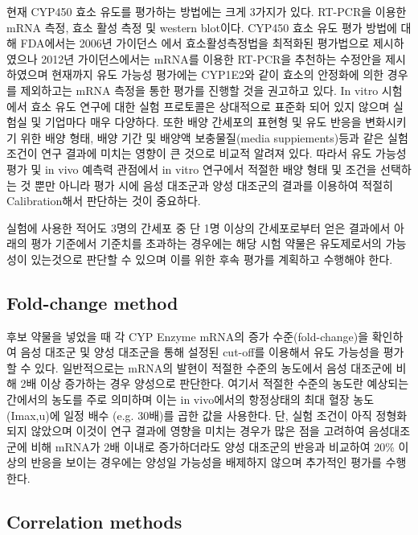 \documentclass[
  11pt,
  krantz2, a4paper, twoside]{krantz}
\begin{document}
현재 CYP450 효소 유도를 평가하는 방법에는 크게 3가지가 있다. RT-PCR을
이용한 mRNA 측정, 효소 활성 측정 및 western blot이다. CYP450 효소 유도
평가 방법에 대해 FDA에서는 2006년 가이던스 에서 효소활성측정법을
최적화된 평가법으로 제시하였으나 2012년 가이던스에서는 mRNA를 이용한
RT-PCR을 추천하는 수정안을 제시하였으며 현재까지 유도 가능성 평가에는
CYP1E2와 같이 효소의 안정화에 의한 경우를 제외하고는 mRNA 측정을 통한
평가를 진행할 것을 권고하고 있다. In vitro 시험에서 효소 유도 연구에
대한 실험 프로토콜은 상대적으로 표준화 되어 있지 않으며 실험실 및
기업마다 매우 다양하다. 또한 배양 간세포의 표현형 및 유도 반응을
변화시키기 위한 배양 형태, 배양 기간 및 배양액 보충물질(media
suppiements)등과 같은 실험 조건이 연구 결과에 미치는 영향이 큰 것으로
비교적 알려져 있다. 따라서 유도 가능성 평가 및 in vivo 예측력 관점에서
in vitro 연구에서 적절한 배양 형태 및 조건을 선택하는 것 뿐만 아니라
평가 시에 음성 대조군과 양성 대조군의 결과를 이용하여 적절히
Calibration해서 판단하는 것이 중요하다.

실험에 사용한 적어도 3명의 간세포 중 단 1명 이상의 간세포로부터 얻은
결과에서 아래의 평가 기준에서 기준치를 초과하는 경우에는 해당 시험
약물은 유도제로서의 가능성이 있는것으로 판단할 수 있으며 이를 위한 후속
평가를 계획하고 수행해야 한다.

\hypertarget{fold-change-method}{%
\subsection{Fold-change method}\label{fold-change-method}}

후보 약물을 넣었을 때 각 CYP Enzyme mRNA의 증가 수준(fold-change)을
확인하여 음성 대조군 및 양성 대조군을 통해 설정된 cut-off를 이용해서
유도 가능성을 평가할 수 있다. 일반적으로는 mRNA의 발현이 적절한 수준의
농도에서 음성 대조군에 비해 2배 이상 증가하는 경우 양성으로 판단한다.
여기서 적절한 수준의 농도란 예상되는 간에서의 농도를 주로 의미하며 이는
in vivo에서의 항정상태의 최대 혈장 농도(Imax,u)에 일정 배수 (e.g.
30배)를 곱한 값을 사용한다. 단, 실험 조건이 아직 정형화 되지 않았으며
이것이 연구 결과에 영향을 미치는 경우가 많은 점을 고려하여 음성대조군에
비해 mRNA가 2배 이내로 증가하더라도 양성 대조군의 반응과 비교하여 20\%
이상의 반응을 보이는 경우에는 양성일 가능성을 배제하지 않으며 추가적인
평가를 수행한다.

\hypertarget{correlation-methods}{%
\subsection{Correlation methods}\label{correlation-methods}}
\end{document}
